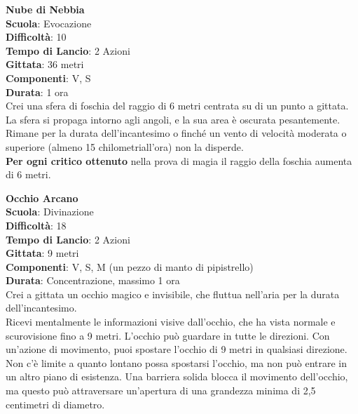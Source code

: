 \begin{multicols}{2}
\medskip\textbf{Nube di Nebbia}\\
\textbf{Scuola}: Evocazione\\
\textbf{Difficoltà}:  10\\
\textbf{Tempo di Lancio}: 2 Azioni\\
\textbf{Gittata}: 36 metri\\
\textbf{Componenti}: V, S\\
\textbf{Durata}: 1 ora\\
Crei una sfera di foschia del raggio di 6 metri centrata su di un punto a gittata. La sfera si propaga intorno agli angoli, e la sua area è oscurata pesantemente. Rimane per la durata dell'incantesimo o finché un vento di velocità moderata o superiore (almeno 15 chilometriall'ora)  non la disperde.\\
\textbf{Per ogni critico ottenuto} nella prova di magia il raggio della foschia aumenta di 6 metri.

\medskip\textbf{Occhio Arcano}\\
\textbf{Scuola}: Divinazione\\
\textbf{Difficoltà}:  18\\
\textbf{Tempo di Lancio}: 2 Azioni\\
\textbf{Gittata}: 9 metri\\
\textbf{Componenti}: V, S, M (un pezzo di manto di pipistrello)\\
\textbf{Durata}: Concentrazione, massimo 1 ora\\
Crei a gittata un occhio magico e invisibile, che fluttua nell'aria per la durata dell'incantesimo.\\
Ricevi mentalmente le informazioni visive dall'occhio, che ha vista normale e scurovisione fino a 9 metri. L’occhio può guardare in tutte le direzioni. Con un'azione di movimento, puoi spostare l’occhio di 9 metri in qualsiasi direzione. Non c’è limite a quanto lontano possa spostarsi l’occhio, ma non può entrare in un altro piano di esistenza. Una barriera solida blocca il movimento dell'occhio, ma questo può attraversare un'apertura di una grandezza minima di 2,5 centimetri di diametro.


\end{multicols}
